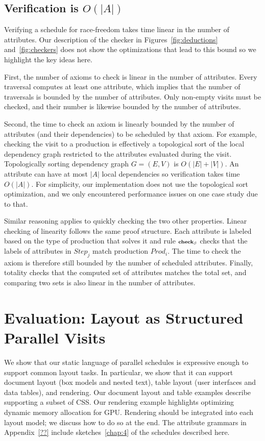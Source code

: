 \subsection{Verification is $O(|A|)$}
Verifying a schedule for race-freedom takes time linear in the number of attributes. Our  description of the checker in Figures~\ref{fig:deductions} and~\ref{fig:checkers} does not show the optimizations that lead to this bound so we highlight the key ideas here.

First, the number of axioms to check is linear in the number of attributes. Every traversal computes at least one attribute, which implies that the number of traversals is bounded by the number of attributes. Only non-empty visits must be checked, and their number is likewise bounded by the number of attributes.

Second, the time to check an axiom is linearly bounded by the number of attributes (and their dependencies) to be scheduled by that axiom. For example, checking the visit to a production is effectively a topological sort of the local dependency graph restricted to the attributes evaluated during the visit. Topologically sorting dependency graph $G = (E, V)$ is $O(|E| + |V|)$. An attribute can have at most $|A|$ local dependencies so verification takes time $O(|A|)$.  For simplicity, our implementation does not use the topological sort optimization, and we only encountered performance issues on one case study due to that.

Similar reasoning applies to quickly checking the two other properties. Linear checking of linearity follows the same proof structure. Each attribute is labeled based on the type of production that solves it and rule ${\scriptstyle\textbf {check}_\beta}$ checks that the labels of attributes in $Step_j$ match production $Prod_i$. The time to check the axiom is therefore still bounded by the number of scheduled attributes. Finally, totality checks that the computed set of attributes matches the total set, and comparing two sets is also linear in the number of attributes.







\section{Evaluation: Layout as Structured Parallel Visits}

We show that our static language of parallel schedules is expressive enough to support common layout tasks.  In particular, we show that it can support document layout (box models and nested text), table layout (user interfaces and data tables), and rendering. Our document layout and table examples describe supporting a subset of CSS. Our rendering example highlights optimizing dynamic memory allocation for GPU. Rendering should be integrated into each layout model; we discuss how to do so at the end. The attribute grammars in Appendix~\ref{??} include sketches~\ref{chap:4} of the schedules described here.

